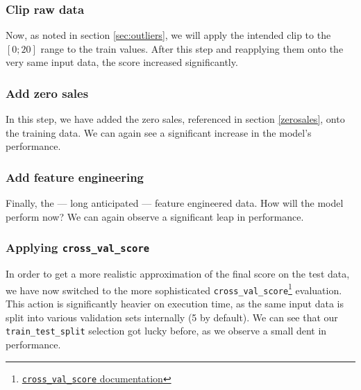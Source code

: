 \subsubsection{Clip raw data }

Now, as noted in section \ref{sec:outliers}, we will apply the intended clip to the $[0;20]$ range to the train values. After this step and reapplying them onto the very same input data, the score increased significantly.

\subsubsection{Add zero sales }

In this step, we have added the zero sales, referenced in section \ref{zerosales}, onto the training data. We can again see a significant increase in the model's performance.


\subsubsection{Add feature engineering }

Finally, the --- long anticipated --- feature engineered data. How will the model perform now? We can again observe a significant leap in performance.

\subsubsection{Applying \texttt{cross\_val\_score} }

In order to get a more realistic approximation of the final score on the test data, we have now switched to the more sophisticated \texttt{cross\_val\_score}\footnote{\href{https://scikit-learn.org/stable/modules/generated/sklearn.model_selection.cross_val_score.html}{\texttt{cross\_val\_score} documentation}} evaluation. This action is significantly heavier on execution time, as the same input data is split into various validation sets internally (5 by default).
We can see that our \texttt{train\_test\_split} selection got lucky before, as we observe a small dent in performance.

